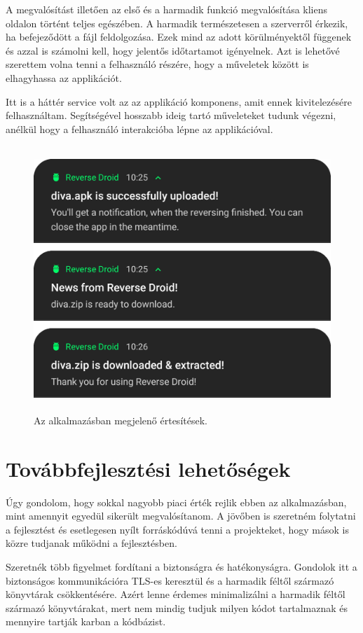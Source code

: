 \documentclass{thesis-ekf}
\theoremstyle{definition}
\theoremstyle{remark}
\begin{document}
A megvalósítást illetően az első és a harmadik funkció megvalósítása kliens oldalon történt teljes egészében.
A harmadik természetesen a szerverről érkezik, ha befejeződött a fájl feldolgozása.
Ezek mind az adott körülményektől függenek és azzal is számolni kell, hogy jelentős időtartamot igényelnek.
Azt is lehetővé szerettem volna tenni a felhasználó részére, hogy a műveletek között is elhagyhassa az applikációt.

Itt is a háttér service volt az az applikáció komponens, amit ennek kivitelezésére felhasználtam.
Segítségével hosszabb ideig tartó műveleteket tudunk végezni, anélkül hogy a felhasználó interakcióba lépne az applikációval.

\begin{figure}[!h]
	\centering
	\includegraphics[height=10cm]{pictures/notifications}
	\caption{Az alkalmazásban megjelenő értesítések.}
	\label{notifications}
\end{figure}

\chapter{Továbbfejlesztési lehetőségek}\label{lehetosegek}

Úgy gondolom, hogy sokkal nagyobb piaci érték rejlik ebben az alkalmazásban, mint amennyit egyedül sikerült megvalósítanom.
A jövőben is szeretném folytatni a fejlesztést és esetlegesen nyílt forráskódúvá tenni a projekteket, hogy mások is közre tudjanak működni a fejlesztésben.

Szeretnék több figyelmet fordítani a biztonságra és hatékonyságra. 
Gondolok itt a biztonságos kommunikációra TLS-es keresztül és a harmadik féltől származó könyvtárak csökkentésére.
Azért lenne érdemes minimalizálni a harmadik féltől származó könyvtárakat, mert nem mindig tudjuk milyen kódot tartalmaznak és mennyire tartják karban a kódbázist.
\end{document}
